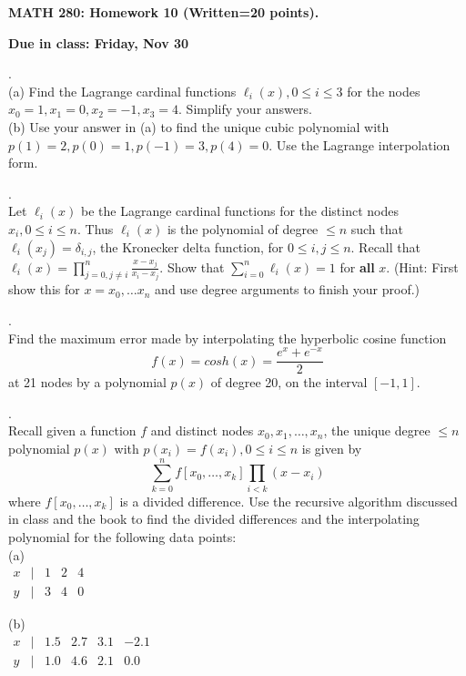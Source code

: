 \documentclass[12 pt]{article}
\begin{document}
\centerline{\bf MATH 280: Homework 10 (Written=20 points). }
\centerline{\bf Due in class: Friday, Nov 30}

\bigskip

. \\ 
(a) Find the Lagrange cardinal functions $\ell_i(x), 0 \leq i \leq 3$ for the nodes $x_0=1, x_1=0, x_2=-1, x_3=4$. 
Simplify your answers. \\

\noindent
(b) Use your answer in (a) to find the unique cubic polynomial with $p(1)=2, p(0)=1, p(-1)=3, p(4)=0$. Use the Lagrange interpolation form. \\

\medskip

. \\
Let $\ell_i(x)$ be the Lagrange cardinal functions for the distinct nodes $x_i, 0 \leq i \leq n$. Thus 
$\ell_i(x)$ is the polynomial of degree $\leq n$ such that $\ell_i(x_j) = \delta_{i,j}$, the Kronecker delta function, for $0 \leq i,j \leq n$.
Recall that $\ell_i(x) = \prod_{j=0, j \neq i}^n \frac{x-x_j}{x_i-x_j}$. Show that 
$\sum_{i=0}^n \ell_i(x) = 1$ for {\bf all} $x$. (Hint: First show this for $x=x_0, \dots x_n$ and use degree arguments to finish your proof.)

\medskip

. \\
Find the maximum error made by interpolating the hyperbolic cosine function $$f(x)=cosh(x)=\frac{e^x+e^{-x}}{2}$$ at 21 nodes by a polynomial $p(x)$ of degree 20, on the interval $[-1,1]$. 

\medskip

. \\
Recall given a function $f$ and distinct nodes $x_0, x_1, \dots, x_n$, the unique degree $\leq n$ polynomial $p(x)$ with $p(x_i)=f(x_i), 0 \leq i \leq n$ 
is given by 
$$
\sum_{k=0}^n f[x_0,\dots,x_k] \prod_{i < k} (x-x_i)
$$
where $f[x_0,\dots,x_k]$ is a divided difference. Use the recursive algorithm discussed in class and the book to find the divided differences and 
the interpolating polynomial for the following data points: \\
(a) \\
$\begin{matrix} x & | & 1 & 2 & 4 
\\  y & | & 3 & 4 & 0
\end{matrix}$

\noindent
(b) \\
$\begin{matrix} x & | & 1.5 & 2.7 & 3.1 & -2.1 \\
y & | & 1.0 & 4.6 & 2.1 & 0.0 
\end{matrix}
$
\end{document}
